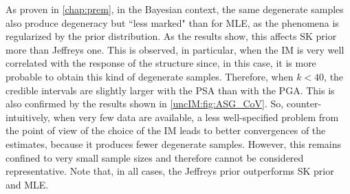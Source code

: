     As proven in \cref{chap:prem}, in the Bayesian context, the same degenerate samples also produce degeneracy but ``less marked" than for MLE, as the phenomena is regularized by the prior distribution. %
    As the results show, this affects SK prior more than Jeffreys one. This is observed, in particular, when the IM is very well correlated with the response of the structure since, in this case, it is more probable to obtain this kind of degenerate samples. Therefore, when $k < 40$, the credible intervals are slightly larger with the PSA than with the PGA. This is also confirmed by the results shown in \cref{uncIM:fig:ASG_CoV}. So, counter-intuitively, when very few data are available, a less well-specified problem from the point of view of the choice of the IM leads to better convergences of the estimates, because it produces fewer degenerate samples. However, this remains confined to very small sample sizes and therefore cannot be considered representative. Note that, in all cases, the Jeffreys prior outperforms SK prior and MLE.



